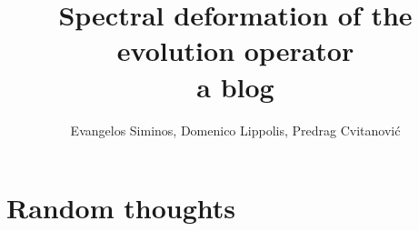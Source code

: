 \documentclass[10pt,openany]{book}
\title{Spectral deformation of the evolution operator
       \\ \Huge a blog}
\author{Evangelos Siminos, Domenico Lippolis,
        Predrag Cvitanovi\'{c}}
\begin{document}
\maketitle

\tableofcontents

\chapter{Random thoughts}
\label{s:strategy}


\newpage
% 
% 


\newpage
% 
\end{document}
